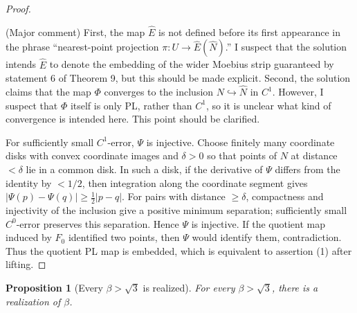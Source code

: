 \documentclass[12pt]{article}
\theoremstyle{plain}
\newtheorem{proposition}[theorem]{Proposition}
\newcommand{\review}[1]{\begin{reviewbox}#1\end{reviewbox}}
\begin{document}
\begin{proof}
\review{(Major comment) First, the map $\hat E$ is not defined before its first appearance in the phrase ``nearest-point projection $\pi: U \rightarrow \hat E(\widehat N)$.'' I suspect that the solution intends $\hat E$ to denote the embedding of the wider Moebius strip guaranteed by statement 6 of Theorem 9, but this should be made explicit.
Second, the solution claims that the map $\Phi$ converges to the inclusion $N \hookrightarrow \widehat N$ in $C^1$. However, I suspect that $\Phi$ itself is only PL, rather than $C^1$, so it is unclear what kind of convergence is intended here. This point should be clarified.}


For sufficiently small \(C^1\)-error, \(\Psi\) is injective.  Choose finitely
many coordinate disks with convex coordinate images and \(\delta>0\) so that
points of \(N\) at distance \(<\delta\) lie in a common disk.  In such a disk,
if the derivative of \(\Psi\) differs from the identity by \(<1/2\), then
integration along the coordinate segment gives
\(|\Psi(p)-\Psi(q)|\ge \frac12|p-q|\).  For pairs with distance \(\ge\delta\),
compactness and injectivity of the inclusion give a positive minimum
separation; sufficiently small \(C^0\)-error preserves this separation.  Hence
\(\Psi\) is injective.  If the quotient map induced by \(F_0\) identified two
points, then \(\Psi\) would identify them, contradiction.  Thus the quotient
PL map is embedded, which is equivalent to assertion (1) after lifting.
\end{proof}

\begin{proposition}[Every \(\beta>\sqrt3\) is realized]\label{prop:upper}
For every \(\beta>\sqrt3\), there is a realization of \(\beta\).
\end{proposition}
\end{document}
